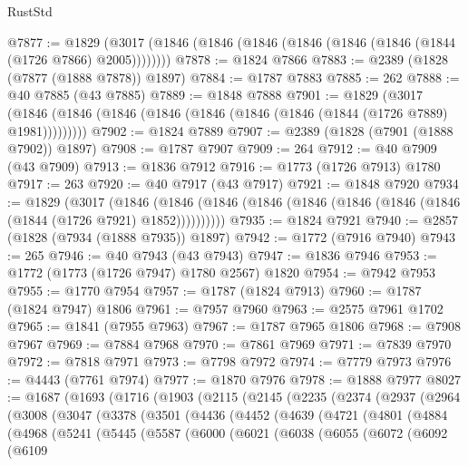 \begin{lexlean}{RustStd}
\begin{coremodule}
@7877 := @1829 (@3017 (@1846 (@1846 (@1846 (@1846 (@1846 (@1846 (@1844 (@1726 @7866) @2005))))))))
@7878 := @1824 @7866
@7883 := @2389 (@1828 (@7877 (@1888 @7878)) @1897)
@7884 := @1787 @7883
@7885 := 262
@7888 := @40 @7885 (@43 @7885)
@7889 := @1848 @7888
@7901 := @1829
    (@3017 (@1846 (@1846 (@1846 (@1846 (@1846 (@1846 (@1846 (@1844 (@1726 @7889) @1981)))))))))
@7902 := @1824 @7889
@7907 := @2389 (@1828 (@7901 (@1888 @7902)) @1897)
@7908 := @1787 @7907
@7909 := 264
@7912 := @40 @7909 (@43 @7909)
@7913 := @1836 @7912
@7916 := @1773 (@1726 @7913) @1780
@7917 := 263
@7920 := @40 @7917 (@43 @7917)
@7921 := @1848 @7920
@7934 := @1829
    (@3017
      (@1846 (@1846 (@1846 (@1846 (@1846 (@1846 (@1846 (@1846 (@1844 (@1726 @7921) @1852))))))))))
@7935 := @1824 @7921
@7940 := @2857 (@1828 (@7934 (@1888 @7935)) @1897)
@7942 := @1772 (@7916 @7940)
@7943 := 265
@7946 := @40 @7943 (@43 @7943)
@7947 := @1836 @7946
@7953 := @1772 (@1773 (@1726 @7947) @1780 @2567) @1820
@7954 := @7942 @7953
@7955 := @1770 @7954
@7957 := @1787 (@1824 @7913)
@7960 := @1787 (@1824 @7947) @1806
@7961 := @7957 @7960
@7963 := @2575 @7961 @1702
@7965 := @1841 (@7955 @7963)
@7967 := @1787 @7965 @1806
@7968 := @7908 @7967
@7969 := @7884 @7968
@7970 := @7861 @7969
@7971 := @7839 @7970
@7972 := @7818 @7971
@7973 := @7798 @7972
@7974 := @7779 @7973
@7976 := @4443 (@7761 @7974)
@7977 := @1870 @7976
@7978 := @1888 @7977
@8027 := @1687
    (@1693
      (@1716
        (@1903
          (@2115
            (@2145
              (@2235
                (@2374
                  (@2937
                    (@2964
                      (@3008
                        (@3047
                          (@3378
                            (@3501
                              (@4436
                                (@4452
                                  (@4639
                                    (@4721
                                      (@4801
                                        (@4884
                                          (@4968
                                            (@5241
                                              (@5445
                                                (@5587
                                                  (@6000
                                                    (@6021
                                                      (@6038
                                                        (@6055
                                                          (@6072
                                                            (@6092
                                                              (@6109

\end{coremodule}
\end{lexlean}
